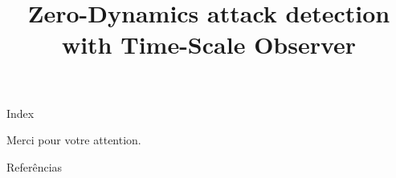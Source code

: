 \documentclass[ieee,english]{slides}
\title{Zero-Dynamics attack detection with Time-Scale Observer}
\begin{document}
\maketitle{}

\begin{slide}{Index}
  \begin{minipage}[t][0.4\textheight][t]{0.45\textwidth}
    \tableofcontents[sections={1-4}]
  \end{minipage}
  \begin{minipage}[t][0.4\baselineskip][t]{0.45\textwidth}
    \tableofcontents[sections={5-}]
  \end{minipage}
  \vfill\null{}
\end{slide}









\begin{slide}{}
  \vspace*{\fill}
  \begin{center}
    \textcolor{fg}{\Large{Merci pour votre attention.}}
  \end{center}
  \vspace*{\fill}
\end{slide}

\begin{slide}[allowframebreaks]{Referências}
  \nocite{*}
  \printbibliography{}
\end{slide}
\end{document}
